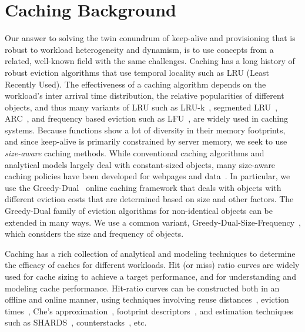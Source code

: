 \section{Caching Background}
\label{sec:faascache:bg}

Our answer to solving the twin conundrum of keep-alive and provisioning that is robust to workload heterogeneity and dynamism, is to use concepts from a related, well-known field with the same challenges. 
%
Caching has a long history of robust eviction algorithms that use temporal locality such as  LRU (Least Recently Used). 
The effectiveness of a caching algorithm depends on the workload's inter arrival time distribution, the relative popularities of different objects, and thus many variants of LRU such as LRU-k~\cite{o1993lru}, segmented LRU~\cite{cheng2000lru}, ARC~\cite{megiddo2003arc}, and frequency based eviction such as LFU~\cite{einziger2017tinylfu}, are widely used in caching systems. 
Because functions show a lot of diversity in their memory footprints, and since keep-alive is primarily constrained by server memory, we seek to use \emph{size-aware} caching methods. 
While conventional caching algorithms and analytical models largely deal with constant-sized objects, many size-aware caching policies have been developed for webpages and data~\cite{cao_irani_1997}. 
In particular, we use the Greedy-Dual~\cite{young_gd_orig_94} online caching framework that deals with objects with different eviction costs that are determined based on size and other factors.
The Greedy-Dual family of eviction algorithms for non-identical objects can be extended in many ways.
We use a common variant, Greedy-Dual-Size-Frequency~\cite{gdsf, gdfs_2001,cherkasova2001role}, which considers the size and frequency of objects. 


Caching has a rich collection of analytical and modeling techniques to determine the efficacy of caches for different workloads.
Hit (or miss) ratio curves are widely used for cache sizing to achieve a target performance, and for understanding and modeling cache performance. 
Hit-ratio curves can be constructed both in an offline and online manner, using techniques involving reuse distances~\cite{osca_atc20}, eviction times~\cite{hu2016kinetic}, Che's approximation~\cite{che2002hierarchical}, footprint descriptors~\cite{sundarrajan2017footprint}, and estimation techniques such as SHARDS~\cite{shards}, counterstacks~\cite{counterstacks}, etc. 

